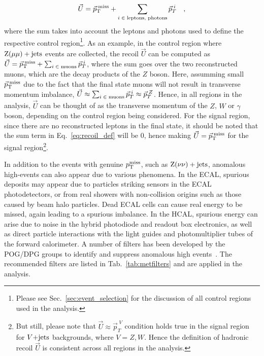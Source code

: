 \begin{equation}
  \vec{U} = \vec{p}_{\textrm{T}}^{\;\textrm{miss}} + \sum _{i\;\in\;\textrm{leptons, photons}}\vec{p}_{T}^{\;i} \quad ,
  \label{eq:recoil_def}
\end{equation}
where the sum takes into account the leptons and photons used to define the respective control 
region\footnote{Please see Sec.~\ref{sec:event_selection} for the discussion of all control regions
used in the analysis.}.
As an example, in the control region where $\mathrm{Z}(\mu\mu)+\textrm{jets}$ events are collected, the recoil $\vec{U}$ can be
computed as $\vec{U} = \vec{p}_{\textrm{T}}^{\;\textrm{miss}} + \sum_{i\;\in\;\textrm{muons}} \vec{p}_{T}^{\;i}$, where the sum goes over
the two reconstructed muons, which are the decay products of the $Z$ boson. Here, assumming small $\vec{p}_{\textrm{T}}^{\;\textrm{miss}}$
due to the fact that the final state muons will not result in transverse momentum imbalance, 
$\vec{U} \approx \sum_{i\;\in\;\textrm{muons}} \vec{p}_{T}^{\;i} \approx \vec{p}_T^{\;Z}$. Hence,
in all regions in the analysis, $\vec{U}$ can be thought of as the transverse momentum of the $Z$, $W$ or $\gamma$ 
boson, depending on the control region being considered.
For the signal region, 
since there are no reconstructed leptons in the final state, it should be noted that the sum term
in Eq.~\ref{eq:recoil_def} will be $0$, hence making $\vec{U} = \vec{p}_{\textrm{T}}^{\;\textrm{miss}}$ for the signal 
region\footnote{But still, please note that $\vec{U} \approx \vec{p}_T^{\;V}$ condition holds true in the
signal region for $V\text{+jets}$ backgrounds, where $V = Z, W$. Hence the definition of hadronic recoil $\vec{U}$ is consistent
across all regions in the analysis.}.


In addition to the events with genuine $p_{\textrm{T}}^{\textrm{miss}}$, such as $\textrm{Z}(\nu\nu)+\textrm{jets}$, 
anomalous high-\ptmiss events can also appear due to various phenomena.
In the ECAL, spurious deposits may appear due to particles striking
sensors in the ECAL photodetectors, or from real showers with non-collision
origins such as those caused by beam halo particles. Dead ECAL cells can cause real
energy to be missed, again leading to a spurious imbalance.
In the HCAL, spurious energy can arise due to  noise in the hybrid
photodiode and readout box  electronics, as well as
direct particle interactions with  the light guides and
photomultiplier tubes of the forward calorimeter. 
A number of filters has been developed by the POG/DPG groups to identify and suppress anomalous high
\ptmiss events~\cite{CMS-JME-TWIKI-FILTER}. The recommended filters are listed in Tab.~\ref{tab:metfilters} and are applied in the analysis.

